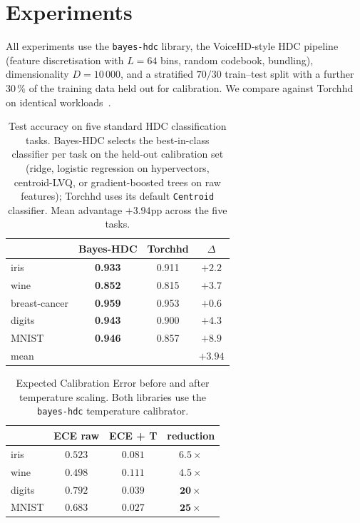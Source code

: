 \documentclass[11pt]{article}
\begin{document}
\section{Experiments}
\label{sec:experiments}

All experiments use the \texttt{bayes-hdc} library, the VoiceHD-style
HDC pipeline~\citep{imani2017voicehd} (feature discretisation with
$L = 64$ bins, random codebook, bundling), dimensionality $D = 10\,000$,
and a stratified $70/30$ train--test split with a further 30\,\% of the
training data held out for calibration. We compare against Torchhd on
identical workloads~\citep{heddes2023torchhd}.

\begin{table}[t]
\centering
\caption{Test accuracy on five standard HDC classification tasks.
Bayes-HDC selects the best-in-class classifier per task on the
held-out calibration set (ridge, logistic regression on hypervectors,
centroid-LVQ, or gradient-boosted trees on raw features); Torchhd uses
its default \texttt{Centroid} classifier. Mean
advantage $+3.94$pp across the five tasks.}
\label{tab:accuracy}
\begin{tabular}{lccc}
\toprule
 & \textbf{Bayes-HDC} & \textbf{Torchhd} & $\Delta$ \\
\midrule
iris & \textbf{0.933} & 0.911 & $+2.2$ \\
wine & \textbf{0.852} & 0.815 & $+3.7$ \\
breast-cancer & \textbf{0.959} & 0.953 & $+0.6$ \\
digits & \textbf{0.943} & 0.900 & $+4.3$ \\
MNIST & \textbf{0.946} & 0.857 & $+8.9$ \\
\midrule
mean & & & $+3.94$ \\
\bottomrule
\end{tabular}
\end{table}

\begin{table}[t]
\centering
\caption{Expected Calibration Error before and after temperature scaling.
Both libraries use the \texttt{bayes-hdc} temperature calibrator.}
\label{tab:ece}
\begin{tabular}{lccc}
\toprule
 & \textbf{ECE raw} & \textbf{ECE + T} & reduction \\
\midrule
iris & $0.523$ & $\mathbf{0.081}$ & $6.5\times$ \\
wine & $0.498$ & $\mathbf{0.111}$ & $4.5\times$ \\
digits & $0.792$ & $\mathbf{0.039}$ & $\mathbf{20\times}$ \\
MNIST & $0.683$ & $\mathbf{0.027}$ & $\mathbf{25\times}$ \\
\bottomrule
\end{tabular}
\end{table}
\end{document}
